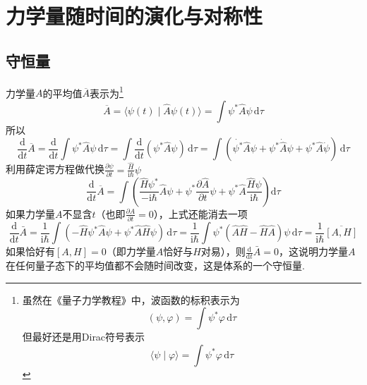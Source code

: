 \section{力学量随时间的演化与对称性}
\subsection{守恒量}
力学量$A$的平均值$\overline{A}$表示为\footnote{
    虽然在《量子力学教程》中，波函数的标积表示为
    $$
        (\psi, \varphi)=\int\psi^*\varphi\,\mathrm{d}\tau
    $$
    但最好还是用Dirac符号表示
    $$
        \langle\psi\mid\varphi\rangle=\int\psi^*\varphi\,\mathrm{d}\tau
    $$
}
$$
    \overline{A}=\langle\psi(t)\mid\hat{A}\psi(t)\rangle=\int\psi^*\hat{A}\psi\,\mathrm{d}\tau
$$
所以
$$
    \frac{\mathrm{d}}{\mathrm{d}t}\overline{A}
    =\frac{\mathrm{d}}{\mathrm{d}t}\int\psi^*\hat{A}\psi\,\mathrm{d}\tau
    =\int\frac{\mathrm{d}}{\mathrm{d}t}(\psi^*\hat{A}\psi)\,\mathrm{d}\tau
    =\int\left(\dot{\psi^*}\hat{A}\psi + \psi^*\dot{\hat{A}}\psi + \psi^*\hat{A}\dot{\psi}\right)\,\mathrm{d}\tau
$$
利用薛定谔方程做代换$\frac{\partial \psi}{\partial t}=\frac{\hat{H}}{\mathrm{i}\hbar}\psi$
$$
    \frac{\mathrm{d}}{\mathrm{d}t}\overline{A}
    =\int\left( \frac{\hat{H}\psi^*}{-\mathrm{i}\hbar}\hat{A}\psi
    + \psi^*\frac{\partial \hat{A}}{\partial t}\psi
    + \psi^*\hat{A}\frac{\hat{H}\psi}{\mathrm{i}\hbar}
    \right)\mathrm{d}\tau
$$
如果力学量$A$不显含$t$（也即$\frac{\partial A}{\partial t}=0$），上式还能消去一项
\begin{equation}
    \frac{\mathrm{d}}{\mathrm{d}t}\bar{A}
    =\frac{1}{\mathrm{i}\hbar}\int\left(-\hat{H}\psi^*\hat{A}\psi + \psi^*\hat{A}\hat{H}\psi\right)\,\mathrm{d}\tau
    =\frac{1}{\mathrm{i}\hbar}\int\psi^*(\hat{A}\hat{H}-\hat{H}\hat{A})\psi\,\mathrm{d}\tau
    =\frac{1}{\mathrm{i}\hbar}\overline{[A,H]}
\end{equation}
如果恰好有$[A, H]=0$（即力学量$A$恰好与$H$对易），则$\frac{\mathrm{d}}{\mathrm{d}t}\bar{A}=0$，这说明力学量$A$在任何量子态下的平均值都不会随时间改变，这是体系的一个守恒量.

